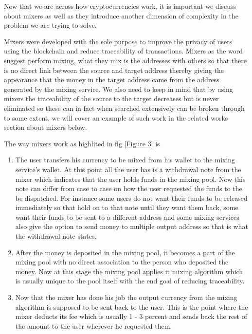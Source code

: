 \documentclass{article}
\begin{document}
        Now that we are across how cryptocurrencies work, it is important we discuss about mixers as well as they introduce another dimension of complexity in the problem we are trying to solve.
        
        Mixers were developed with the sole purpose to improve the privacy of users using the blockchain and reduce traceability of transactions. Mixers as the word suggest perform mixing, what they mix is the addresses with others so that there is no direct link between the source and target address thereby giving the appearance that the money in the target address came from the address generated by the mixing service. We also need to keep in mind that by using mixers the traceability of the source to the target decreases but is never eliminated so these can in fact when searched extensively can be broken through to some extent, we will cover an example of such work in the related works section about mixers below.
        
         The way mixers work as highlited in fig \ref{Figure 3} is
        \begin{enumerate}
            \item The user transfers his currency to be mixed from his wallet to the mixing service's wallet. At this point all the user has is a withdrawal note from the mixer which indicates that the user holds funds in the mixing pool. Now this note can differ from case to case on how the user requested the funds to the be dispatched. For instance some users do not want their funds to be released immediately so that hold on to that note until they want them back, some want their funds to be sent to a different address and some mixing services also give the option to send money to multiple output address so that is what the withdrawal note states.
            \item After the money is deposited in the mixing pool, it becomes a part of the mixing pool with no direct association to the person who deposited the money. Now at this stage the mixing pool applies it mixing algorithm which is usually unique to the pool itself with the end goal of reducing traceability. 
            \item Now that the mixer has done his job the output currency from the mixing algorithm is supposed to be sent back to the user. This is the point where the mixer deducts its fee which is usually 1 - 3 percent and sends back the rest of the amount to the user wherever he requested them.
        \end{enumerate} 
\end{document}
